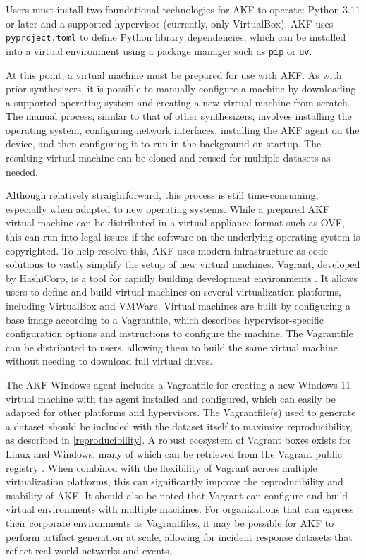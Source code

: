 \documentclass[final,5p,times,twocolumn]{elsarticle}
\newcommand{\passthrough}[1]{#1}
\begin{document}
Users must install two foundational technologies for AKF to operate:
Python 3.11 or later and a supported hypervisor (currently, only
VirtualBox). AKF uses \passthrough{\lstinline!pyproject.toml!} to define
Python library dependencies, which can be installed into a virtual
environment using a package manager such as
\passthrough{\lstinline!pip!} or \passthrough{\lstinline!uv!}.

At this point, a virtual machine must be prepared for use with AKF. As
with prior synthesizers, it is possible to manually configure a machine
by downloading a supported operating system and creating a new virtual
machine from scratch. The manual process, similar to that of other
synthesizers, involves installing the operating system, configuring
network interfaces, installing the AKF agent on the device, and then
configuring it to run in the background on startup. The resulting
virtual machine can be cloned and reused for multiple datasets as
needed.

Although relatively straightforward, this process is still
time-consuming, especially when adapted to new operating systems. While
a prepared AKF virtual machine can be distributed in a virtual appliance
format such as OVF, this can run into legal issues if the software on
the underlying operating system is copyrighted. To help resolve this,
AKF uses modern infrastructure-as-code solutions to vastly simplify the
setup of new virtual machines. Vagrant, developed by HashiCorp, is a
tool for rapidly building development environments
\citep{HashicorpVagrant2025}. It allows users to define and build
virtual machines on several virtualization platforms, including
VirtualBox and VMWare. Virtual machines are built by configuring a base
image according to a Vagrantfile, which describes hypervisor-specific
configuration options and instructions to configure the machine. The
Vagrantfile can be distributed to users, allowing them to build the same
virtual machine without needing to download full virtual drives.

The AKF Windows agent includes a Vagrantfile for creating a new Windows
11 virtual machine with the agent installed and configured, which can
easily be adapted for other platforms and hypervisors. The
Vagrantfile(s) used to generate a dataset should be included with the
dataset itself to maximize reproducibility, as described in
\autoref{reproducibility}. A robust ecosystem of Vagrant boxes exists
for Linux and Windows, many of which can be retrieved from the Vagrant
public registry \citep{hashicorpHashiCorpCloudPlatform}. When
combined with the flexibility of Vagrant across multiple virtualization
platforms, this can significantly improve the reproducibility and
usability of AKF. It should also be noted that Vagrant can configure and
build virtual environments with multiple machines. For organizations
that can express their corporate environments as Vagrantfiles, it may be
possible for AKF to perform artifact generation at scale, allowing for
incident response datasets that reflect real-world networks and events.
\end{document}
